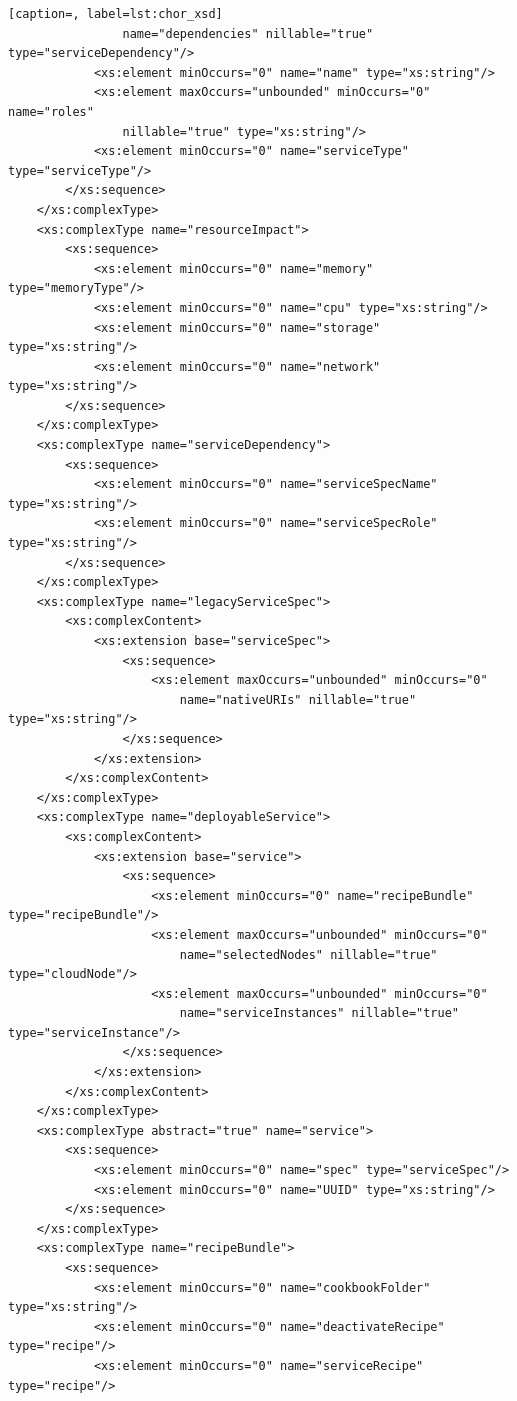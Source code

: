 \documentclass[a4paper, 10pt]{article}
\begin{document}
{\begin{lstlisting}[caption=, label=lst:chor_xsd]
                name="dependencies" nillable="true" type="serviceDependency"/>
            <xs:element minOccurs="0" name="name" type="xs:string"/>
            <xs:element maxOccurs="unbounded" minOccurs="0" name="roles"
                nillable="true" type="xs:string"/>
            <xs:element minOccurs="0" name="serviceType" type="serviceType"/>
        </xs:sequence>
    </xs:complexType>
    <xs:complexType name="resourceImpact">
        <xs:sequence>
            <xs:element minOccurs="0" name="memory" type="memoryType"/>
            <xs:element minOccurs="0" name="cpu" type="xs:string"/>
            <xs:element minOccurs="0" name="storage" type="xs:string"/>
            <xs:element minOccurs="0" name="network" type="xs:string"/>
        </xs:sequence>
    </xs:complexType>
    <xs:complexType name="serviceDependency">
        <xs:sequence>
            <xs:element minOccurs="0" name="serviceSpecName" type="xs:string"/>
            <xs:element minOccurs="0" name="serviceSpecRole" type="xs:string"/>
        </xs:sequence>
    </xs:complexType>
    <xs:complexType name="legacyServiceSpec">
        <xs:complexContent>
            <xs:extension base="serviceSpec">
                <xs:sequence>
                    <xs:element maxOccurs="unbounded" minOccurs="0"
                        name="nativeURIs" nillable="true" type="xs:string"/>
                </xs:sequence>
            </xs:extension>
        </xs:complexContent>
    </xs:complexType>
    <xs:complexType name="deployableService">
        <xs:complexContent>
            <xs:extension base="service">
                <xs:sequence>
                    <xs:element minOccurs="0" name="recipeBundle" type="recipeBundle"/>
                    <xs:element maxOccurs="unbounded" minOccurs="0"
                        name="selectedNodes" nillable="true" type="cloudNode"/>
                    <xs:element maxOccurs="unbounded" minOccurs="0"
                        name="serviceInstances" nillable="true" type="serviceInstance"/>
                </xs:sequence>
            </xs:extension>
        </xs:complexContent>
    </xs:complexType>
    <xs:complexType abstract="true" name="service">
        <xs:sequence>
            <xs:element minOccurs="0" name="spec" type="serviceSpec"/>
            <xs:element minOccurs="0" name="UUID" type="xs:string"/>
        </xs:sequence>
    </xs:complexType>
    <xs:complexType name="recipeBundle">
        <xs:sequence>
            <xs:element minOccurs="0" name="cookbookFolder" type="xs:string"/>
            <xs:element minOccurs="0" name="deactivateRecipe" type="recipe"/>
            <xs:element minOccurs="0" name="serviceRecipe" type="recipe"/>

\end{lstlisting}}
\end{document}
